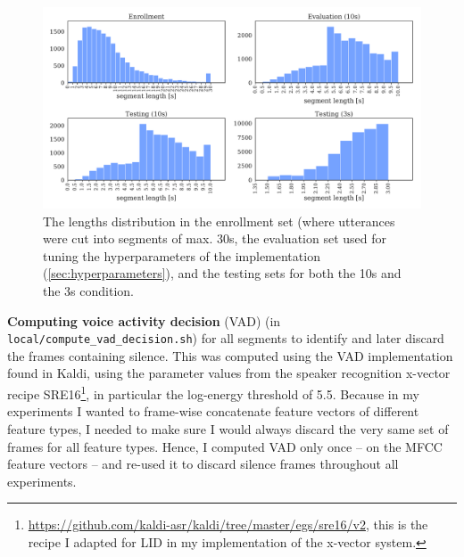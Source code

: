 \documentclass[bsc,frontabs,twoside,singlespacing,parskip,deptreport]{infthesis}
\begin{document}
{{\begin{figure}[h!t]
      \hspace*{-0.3cm}
      \includegraphics[width=15cm]{../img/lengths-segments.pdf}
      \caption{The lengths distribution in the enrollment set (where utterances were cut into segments of max. 30s, the evaluation set used for tuning the hyperparameters of the implementation (\autoref{sec:hyperparameters}), and the testing sets for both the 10s and the 3s condition.}
      \label{fig:lengths-segments}
    \end{figure}
    
    \textbf{Computing voice activity decision} (VAD) (in \verb|local/compute_vad_decision.sh|) for all segments to identify and later discard the frames containing silence. This was computed using the VAD implementation found in Kaldi, using the parameter values from the speaker recognition x-vector recipe SRE16\footnote{\url{https://github.com/kaldi-asr/kaldi/tree/master/egs/sre16/v2}, this is the recipe I adapted for LID in my implementation of the x-vector system.}, in particular the log-energy threshold of 5.5. Because in my experiments I wanted to frame-wise concatenate feature vectors of different feature types, I needed to make sure I would always discard the very same set of frames for all feature types. Hence, I computed VAD only once -- on the MFCC feature vectors -- and re-used it to discard silence frames throughout all experiments.
  }

}
\end{document}
